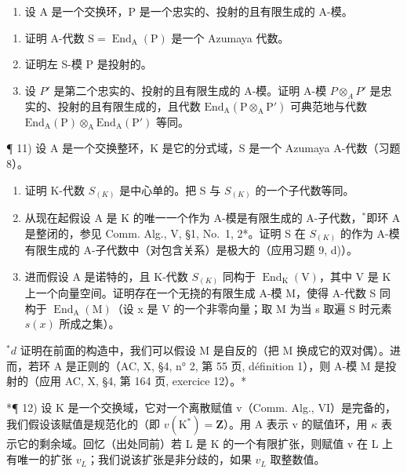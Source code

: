 \begin{enumerate}
\def\labelenumi{\arabic{enumi})}
\setcounter{enumi}{9}
\tightlist
\item
  设 A 是一个交换环，P 是一个忠实的、投射的且有限生成的 A-模。
\end{enumerate}

\begin{enumerate}
\def\labelenumi{\alph{enumi})}
\item
  证明 A-代数 \(\mathrm{S} = \operatorname{End}_{\mathrm{A}}(\mathrm{P})\) 是一个 Azumaya 代数。
\item
  证明左 S-模 P 是投射的。
\item
  设 \(P'\) 是第二个忠实的、投射的且有限生成的 A-模。证明 A-模 \(P \otimes_{A} P'\) 是忠实的、投射的且有限生成的，且代数 \(\text{End}_{\text{A}}(\text{P} \otimes_{\text{A}} \text{P}')\) 可典范地与代数 \(\text{End}_{\text{A}}(\text{P}) \otimes_{\text{A}} \text{End}_{\text{A}}(\text{P}')\) 等同。
\end{enumerate}

¶ 11) 设 A 是一个交换整环，K 是它的分式域，S 是一个 Azumaya A-代数（习题 8）。

\begin{enumerate}
\def\labelenumi{\alph{enumi})}
\item
  证明 K-代数 \(S_{(K)}\) 是中心单的。把 S 与 \(S_{(K)}\) 的一个子代数等同。
\item
  从现在起假设 A 是 K 的唯一一个作为 A-模是有限生成的 A-子代数，\(^{*}\)即环 A 是整闭的，参见 Comm. Alg., V, §1, No.~1, 2*。证明 S 在 \(S_{(K)}\) 的作为 A-模有限生成的 A-子代数中（对包含关系）是极大的（应用习题 9, d)）。
\item
  进而假设 A 是诺特的，且 K-代数 \(S_{(K)}\) 同构于 \(\operatorname{End}_{\mathrm{K}}(\mathrm{V})\)，其中 V 是 K 上一个向量空间。证明存在一个无挠的有限生成 A-模 M，使得 A-代数 S 同构于 \(\operatorname{End}_{\mathrm{A}}(\mathrm{M})\)（设 x 是 V 的一个非零向量；取 M 为当 s 取遍 S 时元素 \(s(x)\) 所成之集）。
\end{enumerate}

\(^{*}d\) 证明在前面的构造中，我们可以假设 M 是自反的（把 M 换成它的双对偶）。进而，若环 A 是正则的（AC, X, §4, n° 2, 第 55 页, définition 1），则 A-模 M 是投射的（应用 AC, X, §4, 第 164 页, exercice 12）。*

*¶ 12) 设 K 是一个交换域，它对一个离散赋值 v（Comm. Alg., VI）是完备的，我们假设该赋值是规范化的（即 \(v(\mathrm{K}^{*}) = \mathbf{Z}\)）。用 A 表示 v 的赋值环，用 \(\kappa\) 表示它的剩余域。回忆（出处同前）若 L 是 K 的一个有限扩张，则赋值 v 在 L 上有唯一的扩张 \(v_{L}\)；我们说该扩张是非分歧的，如果 \(v_{L}\) 取整数值。

